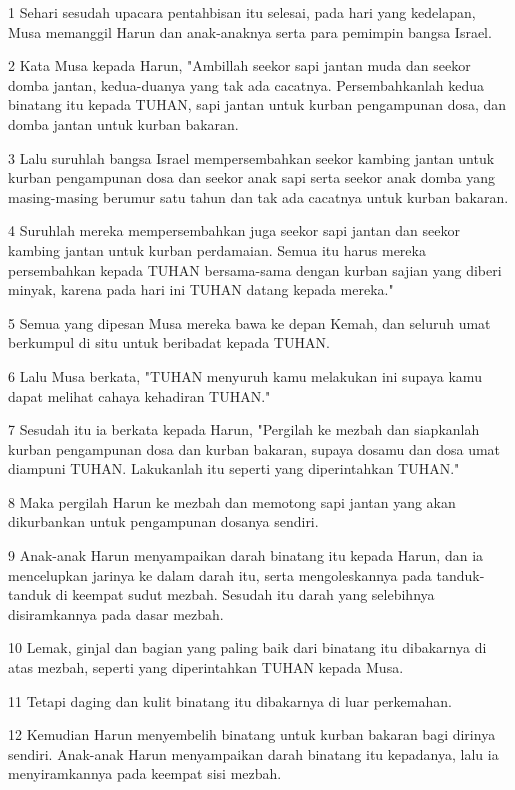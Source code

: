 \par 1 Sehari sesudah upacara pentahbisan itu selesai, pada hari yang kedelapan, Musa memanggil Harun dan anak-anaknya serta para pemimpin bangsa Israel.
\par 2 Kata Musa kepada Harun, "Ambillah seekor sapi jantan muda dan seekor domba jantan, kedua-duanya yang tak ada cacatnya. Persembahkanlah kedua binatang itu kepada TUHAN, sapi jantan untuk kurban pengampunan dosa, dan domba jantan untuk kurban bakaran.
\par 3 Lalu suruhlah bangsa Israel mempersembahkan seekor kambing jantan untuk kurban pengampunan dosa dan seekor anak sapi serta seekor anak domba yang masing-masing berumur satu tahun dan tak ada cacatnya untuk kurban bakaran.
\par 4 Suruhlah mereka mempersembahkan juga seekor sapi jantan dan seekor kambing jantan untuk kurban perdamaian. Semua itu harus mereka persembahkan kepada TUHAN bersama-sama dengan kurban sajian yang diberi minyak, karena pada hari ini TUHAN datang kepada mereka."
\par 5 Semua yang dipesan Musa mereka bawa ke depan Kemah, dan seluruh umat berkumpul di situ untuk beribadat kepada TUHAN.
\par 6 Lalu Musa berkata, "TUHAN menyuruh kamu melakukan ini supaya kamu dapat melihat cahaya kehadiran TUHAN."
\par 7 Sesudah itu ia berkata kepada Harun, "Pergilah ke mezbah dan siapkanlah kurban pengampunan dosa dan kurban bakaran, supaya dosamu dan dosa umat diampuni TUHAN. Lakukanlah itu seperti yang diperintahkan TUHAN."
\par 8 Maka pergilah Harun ke mezbah dan memotong sapi jantan yang akan dikurbankan untuk pengampunan dosanya sendiri.
\par 9 Anak-anak Harun menyampaikan darah binatang itu kepada Harun, dan ia mencelupkan jarinya ke dalam darah itu, serta mengoleskannya pada tanduk-tanduk di keempat sudut mezbah. Sesudah itu darah yang selebihnya disiramkannya pada dasar mezbah.
\par 10 Lemak, ginjal dan bagian yang paling baik dari binatang itu dibakarnya di atas mezbah, seperti yang diperintahkan TUHAN kepada Musa.
\par 11 Tetapi daging dan kulit binatang itu dibakarnya di luar perkemahan.
\par 12 Kemudian Harun menyembelih binatang untuk kurban bakaran bagi dirinya sendiri. Anak-anak Harun menyampaikan darah binatang itu kepadanya, lalu ia menyiramkannya pada keempat sisi mezbah.
